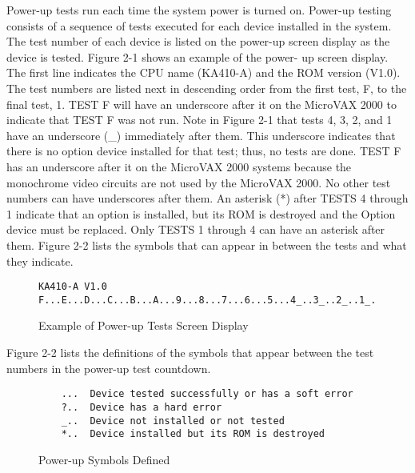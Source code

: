 \documentclass{decsectional}
\begin{document}
Power-up tests run each time the system power is turned on. Power-up
testing consists of a sequence of tests executed for each device installed in
the system. The test number of each device is listed on the power-up screen
display as the device is tested. Figure 2-1 shows an example of the power-
up screen display. The first line indicates the CPU name (KA410-A) and the
ROM version (V1.0). The test numbers are listed next in descending order
from the first test, F, to the final test, 1. TEST F will have an underscore
after it on the MicroVAX 2000 to indicate that TEST F was not run. Note in
Figure 2-1 that tests 4, 3, 2, and 1 have an underscore (\_) immediately after
them. This underscore indicates that there is no option device installed for
that test; thus, no tests are done. TEST F has an underscore after it on the
MicroVAX 2000 systems because the monochrome video circuits are not
used by the MicroVAX 2000. No other test numbers can have underscores
after them. An asterisk (*) after TESTS 4 through 1 indicate that an option is
installed, but its ROM is destroyed and the Option device must be replaced.
Only TESTS 1 through 4 can have an asterisk after them. Figure 2-2 lists
the symbols that can appear in between the tests and what they indicate.

\begin{figure}[H]
\caption{Example of Power-up Tests Screen Display}
\begin{verbatim}
KA410-A V1.0
F...E...D...C...B...A...9...8...7...6...5...4_..3_..2_..1_..
\end{verbatim}
\end{figure}

Figure 2-2 lists the definitions of the symbols that appear between the test
numbers in the power-up test countdown.

\begin{figure}[H]
\caption{Power-up Symbols Defined}
\begin{verbatim}
    ...  Device tested successfully or has a soft error
    ?..  Device has a hard error
    _..  Device not installed or not tested
    *..  Device installed but its ROM is destroyed
\end{verbatim}
\end{figure}
\end{document}
